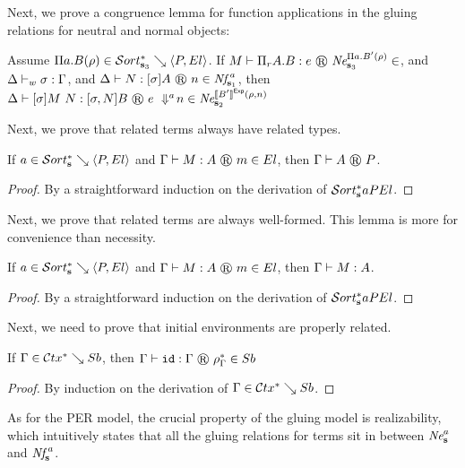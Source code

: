 Next, we prove a congruence lemma for function applications in the gluing relations for neutral and normal objects:
\begin{lemma}
  \label{lem:glu-congruence}
  Assume $\glusortrel[\tmcst s_3] {\dpi a B \rho} P {El}$.
  If $\glutmjudg M {\tppi A B} e {\glune[\tmcst s_3] {\dpi a {B'} \rho}}$, and $\Delta \vdash_{w} \sigma : \Gamma$, and $\glutmjudg \Delta N {\tmclo \sigma A} n {\glunf[\tmcst s_1] a}$,
  then $\glutmjudg \Delta {\tmapp {\tmclo \sigma M} N} {\tmclo {\subext \sigma N} B} {\dapp e {\dreify a n}} {\glune[\tmcst s_2] {\evalexpfunc {B'} {\denvext \rho n}}}$
\end{lemma}

Next, we prove that related terms always have related types.
\begin{lemma}
  \label{lem:reltm-implies-reltyp}
  If $\glusortrel a P {El}$ and $\glutmjudg \Gamma M A m {El}$, then $\glutpjudg \Gamma A P$.
\end{lemma}
\begin{proof}
  By a straightforward induction on the derivation of $\glusort a P {El}$.
\end{proof}

Next, we prove that related terms are always well-formed.
This lemma is more for convenience than necessity.
\begin{lemma}
  \label{lem:reltm-implies-wf}
  If $\glusortrel a P {El}$ and $\glutmjudg \Gamma M A m {El}$, then $\Gamma \vdash M : A$.
\end{lemma}
\begin{proof}
  By a straightforward induction on the derivation of $\glusort a P {El}$.
\end{proof}

Next, we need to prove that initial environments are properly related.

\begin{lemma}
  \label{lem:initenv-gluing}
  If $\Gamma \in \mathcal{C}tx^* \searrow Sb$, then $\glusubjudg \Gamma \subid \Gamma {\denvinit \Gamma} {Sb}$
\end{lemma}
\begin{proof}
  By induction on the derivation of $\Gamma \in \mathcal{C}tx^* \searrow Sb$.
\end{proof}


As for the \ac{PER} model, the crucial property of the gluing model is realizability, which intuitively states that all the gluing relations for terms sit in between $\glune a$ and $\glunf a$.

